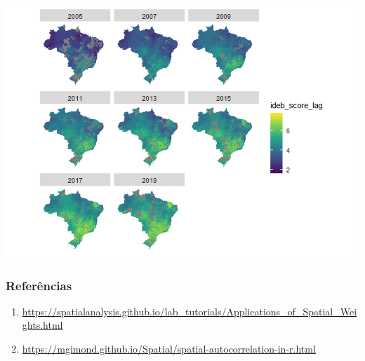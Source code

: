 \documentclass[
]{article}
\begin{document}
\includegraphics{report_files/figure-gfm/unnamed-chunk-5-1.png}

\hypertarget{referuxeancias}{%
\subsubsection{Referências}\label{referuxeancias}}

\begin{enumerate}
\def\labelenumi{\arabic{enumi}.}
\item
  \url{https://spatialanalysis.github.io/lab_tutorials/Applications_of_Spatial_Weights.html}
\item
  \url{https://mgimond.github.io/Spatial/spatial-autocorrelation-in-r.html}
\end{enumerate}
\end{document}
